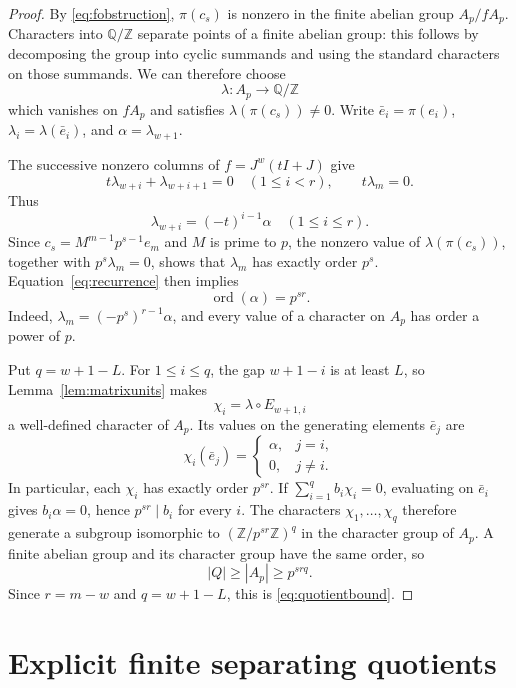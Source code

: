 \documentclass[11pt]{article}
\numberwithin{equation}{section}
\theoremstyle{remark}
\newcommand{\Z}{\mathbb Z}
\newcommand{\Q}{\mathbb Q}
\newcommand{\ord}{\operatorname{ord}}
\begin{document}
\begin{proof}
By \eqref{eq:fobstruction}, $\pi(c_s)$ is nonzero in the finite
abelian group $A_p/fA_p$. Characters into $\Q/\Z$ separate points
of a finite abelian group: this follows by decomposing the group into
cyclic summands and using the standard characters on those summands.
We can therefore choose
\[
 \lambda:A_p\longrightarrow\Q/\Z
\]
which vanishes on $fA_p$ and satisfies $\lambda(\pi(c_s))\ne0$.
Write $\bar e_i=\pi(e_i)$, $\lambda_i=\lambda(\bar e_i)$, and
$\alpha=\lambda_{w+1}$.

The successive nonzero columns of $f=J^w(tI+J)$ give
\[
 t\lambda_{w+i}+\lambda_{w+i+1}=0\quad(1\le i<r),
 \qquad t\lambda_m=0.
\]
Thus
\begin{equation}\label{eq:recurrence}
 \lambda_{w+i}=(-t)^{i-1}\alpha\quad(1\le i\le r).
\end{equation}
Since $c_s=M^{m-1}p^{s-1}e_m$ and $M$ is prime to $p$, the
nonzero value of $\lambda(\pi(c_s))$, together with
$p^s\lambda_m=0$, shows that $\lambda_m$ has exactly order $p^s$.
Equation~\eqref{eq:recurrence} then implies
\begin{equation}\label{eq:alphaorder}
 \ord(\alpha)=p^{sr}.
\end{equation}
Indeed, $\lambda_m=(-p^s)^{r-1}\alpha$, and every value of a
character on $A_p$ has order a power of $p$.

Put $q=w+1-L$. For $1\le i\le q$, the gap $w+1-i$ is at least
$L$, so Lemma~\ref{lem:matrixunits} makes
\[
 \chi_i=\lambda\circ E_{w+1,i}
\]
a well-defined character of $A_p$. Its values on the generating
elements $\bar e_j$ are
\[
 \chi_i(\bar e_j)=
 \begin{cases}\alpha,&j=i,\\0,&j\ne i.\end{cases}
\]
In particular, each $\chi_i$ has exactly order $p^{sr}$. If
$\sum_{i=1}^q b_i\chi_i=0$, evaluating on $\bar e_i$ gives
$b_i\alpha=0$, hence $p^{sr}\mid b_i$ for every $i$. The characters
$\chi_1,\ldots,\chi_q$ therefore generate a subgroup isomorphic to
$(\Z/p^{sr}\Z)^q$ in the character group of $A_p$. A finite
abelian group and its character group have the same order, so
\[
 |Q|\ge |A_p|\ge p^{srq}.
\]
Since $r=m-w$ and $q=w+1-L$, this is \eqref{eq:quotientbound}.
\end{proof}

\section{Explicit finite separating quotients}\label{sec:detectors}
\end{document}
